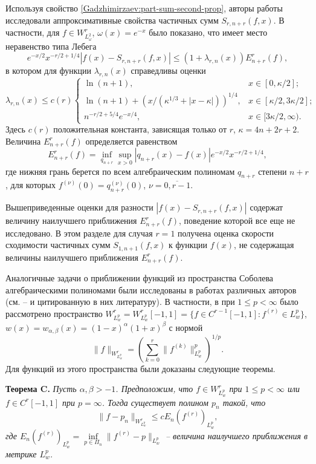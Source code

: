 Используя свойство \eqref{Gadzhimirzaev:part-sum-second-prop}, авторы работы \cite{Gadzhimirzaev:ShII-MMG} исследовали аппроксимативные свойства частичных сумм $S_{r,n+r}(f,x)$. В частности, для $f\in W^r_{L^2_\omega}$, $\omega(x)=e^{-x}$ было показано,
что имеет место неравенство типа Лебега~\cite[теорема 5.2]{Gadzhimirzaev:ShII-MMG}
$$
e^{-x/2}x^{-r/2+1/4}|f(x)-S_{r,n+r}(f,x)|\le (1+\lambda_{r,n}(x))E_{n+r}^r(f),
$$
в котором для функции $\lambda_{r,n}(x)$ справедливы оценки
$$
\lambda_{r,n}(x)\le c(r)
\begin{cases}
	\ln(n+1), & x\in[0,\kappa/2]; \\
	\ln(n+1)+(x/(\kappa^{1/3}+|x-\kappa|))^{1/4}, & x\in[\kappa/2,3\kappa/2]; \\
	n^{-r/2+5/4}e^{-x/4}, & x\in[3\kappa/2,\infty).
\end{cases}
$$
Здесь $c(r)$ положительная константа, зависящая только от $r$, $\kappa=4n+2r+2$.
Величина $E_{n+r}^r(f)$ определяется равенством
$$
E_{n+r}^r(f)=\inf_{q_{n+r}}\sup_{x>0}|q_{n+r}(x)-f(x)|e^{-x/2}x^{-r/2+1/4},
$$
где нижняя грань берется по всем алгебраическим полиномам $q_{n+r}$ степени $n+r$, для которых $f^{(\nu)}(0)=q_{n+r}^{(\nu)}(0)$, $\nu=\overline{0,r-1}$.

Вышеприведенные оценки для разности $|f(x)-S_{r,n+r}(f,x)|$ содержат величину наилучшего приближения $E_{n+r}^r(f)$, поведение которой все еще не исследовано. В этом разделе для случая $r=1$ получена оценка скорости сходимости частичных сумм $S_{1,n+1}(f,x)$ к функции $f(x)$, не содержащая величины наилучшего приближения $E_{n+r}^r(f)$.

Аналогичные задачи о приближении функций из пространства Соболева алгебраическими полиномами были исследованы в работах различных авторов
(см. \cite{Approx-Xu}--\cite{Approx-Leonardo} и цитированную в них литературу). В частности, в \cite{Approx-Xu} при $1\le p<\infty$ было рассмотрено пространство $W^r_{L^p_w}=W^r_{L^p_w}[-1,1]=\{f\in C^{r-1}[-1,1]: f^{(r)}\in L^p_w\}$, $w(x)=w_{\alpha,\beta}(x)=(1-x)^\alpha(1+x)^\beta$ с нормой
$$
\|f\|_{W^r_{L^p_w}}=\left(\sum_{k=0}^{r}\|f^{(k)}\|^p_{L^p_w}\right)^{1/p}.
$$
Для функций из этого пространства были доказаны следующие теоремы.

\textbf{Теорема C.}
\textit{
Пусть $\alpha,\beta>-1$. Предположим, что $f\in W^r_{L^p_w}$ при $1\le p<\infty$ или $f\in C^r[-1,1]$ при $p=\infty$. Тогда существует полином $p_n$ такой, что
$$
\|f-p_n\|_{W^r_{L^p_w}}\le c E_n(f^{(r)})_{L^p_w},
$$
где $E_n(f^{(r)})_{L^p_w}=\inf\limits_{p\in\Pi_n}\|f^{(r)}-p\|_{L^p_w}$ -- величина наилучшего приближения в метрике $L^p_w$.
}

